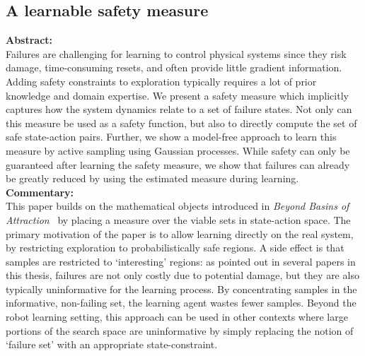 \subsection{A learnable safety measure}
\textbf{Abstract: } \\
Failures are challenging for learning to control physical systems since they risk damage, time-consuming resets, and often provide little gradient information. Adding safety constraints to exploration typically requires a lot of prior knowledge and domain expertise. We present a safety measure which implicitly captures how the system dynamics relate to a set of failure states. Not only can this measure be used as a safety function, but also to directly compute the set of safe state-action pairs. Further, we show a model-free approach to learn this measure by active sampling using Gaussian processes. While safety can only be guaranteed after learning the safety measure, we show that failures can already be greatly reduced by using the estimated measure during learning. \\
\textbf{Commentary: } \\
This paper builds on the mathematical objects introduced in \emph{Beyond Basins of Attraction}~\cite{heim2019beyond} by placing a measure over the viable sets in state-action space. The primary motivation of the paper is to allow learning directly on the real system, by restricting exploration to probabilistically safe regions. A side effect is that samples are restricted to `interesting' regions: as pointed out in several papers in this thesis, failures are not only costly due to potential damage, but they are also typically uninformative for the learning process. By concentrating samples in the informative, non-failing set, the learning agent wastes fewer samples. Beyond the robot learning setting, this approach can be used in other contexts where large portions of the search space are uninformative by simply replacing the notion of `failure set' with an appropriate state-constraint. \\
